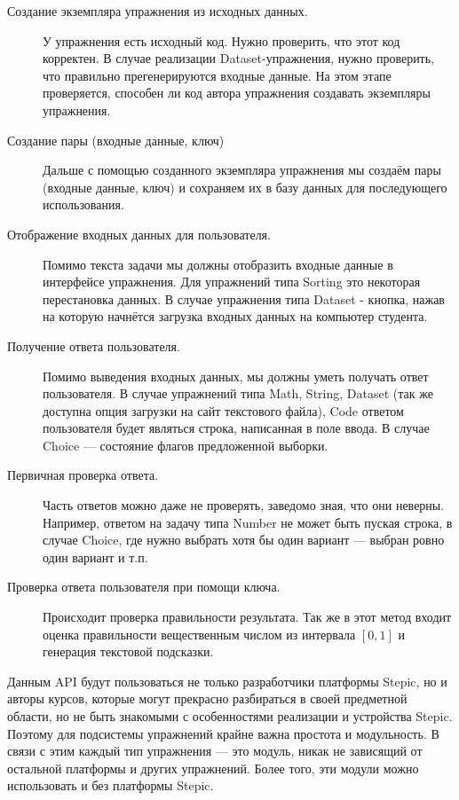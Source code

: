 \documentclass{matmex-diploma-custom}
\begin{document}
\begin{description}
\item[Создание экземпляра упражнения из исходных данных.]

  У упражнения есть исходный код. Нужно проверить, что этот код
  корректен. В случае реализации Dataset-упражнения, нужно проверить,
  что правильно прегенерируются входные данные. На этом этапе
  проверяется, способен ли код автора упражнения создавать экземпляры
  упражнения.

\item[Создание пары (входные данные, ключ)]

  Дальше с помощью созданного экземпляра упражнения мы создаём пары
  (входные данные, ключ) и сохраняем их в базу данных для последующего
  использования.

\item[Отображение входных данных для пользователя.]

  Помимо текста задачи мы должны отобразить входные данные в
  интерфейсе упражнения. Для упражнений типа Sorting это некоторая
  перестановка данных. В случае упражнения типа Dataset - кнопка,
  нажав на которую начнётся загрузка входных данных на компьютер
  студента.

\item[Получение ответа пользователя.]

  Помимо выведения входных данных, мы должны уметь получать ответ
  пользователя. В случае упражнений типа Math, String, Dataset (так же
  доступна опция загрузки на сайт текстового файла), Code ответом
  пользователя будет являться строка, написанная в поле ввода. В
  случае Choice --- состояние флагов предложенной выборки.

\item[Первичная проверка ответа.]

  Часть ответов можно даже не проверять, заведомо зная, что они
  неверны. Например, ответом на задачу типа Number не может быть
  пуская строка, в случае Choice, где нужно выбрать хотя бы один
  вариант --- выбран ровно один вариант и т.п.

\item[Проверка ответа пользователя при помощи ключа.]

  Происходит проверка правильности результата. Так же в этот метод
  входит оценка правильности вещественным числом из интервала $[0, 1]$
  и генерация текстовой подсказки.
\end{description}

Данным API будут пользоваться не только разработчики платформы Stepic,
но и авторы курсов, которые могут прекрасно разбираться в своей
предметной области, но не быть знакомыми с особенностями реализации и
устройства Stepic. Поэтому для подсистемы упражнений крайне важна
простота и модульность. В связи с этим каждый тип упражнения --- это
модуль, никак не зависящий от остальной платформы и других
упражнений. Более того, эти модули можно использовать и без платформы
Stepic.
\end{document}
